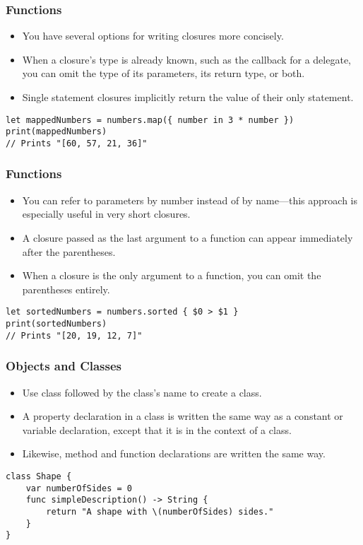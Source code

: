 \begin{frame}[fragile] \frametitle{Functions}
\begin{itemize}
\item You have several options for writing closures more concisely. 
\item When a closure’s type is already known, such as the callback for a delegate, you can omit the type of its parameters, its return type, or both. 
\item Single statement closures implicitly return the value of their only statement.
\end{itemize}

\begin{lstlisting}
let mappedNumbers = numbers.map({ number in 3 * number })
print(mappedNumbers)
// Prints "[60, 57, 21, 36]"
\end{lstlisting}

\end{frame}

\begin{frame}[fragile] \frametitle{Functions}
\begin{itemize}
\item You can refer to parameters by number instead of by name—this approach is especially useful in very short closures. 
\item A closure passed as the last argument to a function can appear immediately after the parentheses. 
\item When a closure is the only argument to a function, you can omit the parentheses entirely.
\end{itemize}

\begin{lstlisting}
let sortedNumbers = numbers.sorted { $0 > $1 }
print(sortedNumbers)
// Prints "[20, 19, 12, 7]"
\end{lstlisting}

\end{frame}

\begin{frame}[fragile] \frametitle{Objects and Classes}
\begin{itemize}
\item Use class followed by the class’s name to create a class. 
\item A property declaration in a class is written the same way as a constant or variable declaration, except that it is in the context of a class. 
\item Likewise, method and function declarations are written the same way.
\end{itemize}

\begin{lstlisting}
class Shape {
    var numberOfSides = 0
    func simpleDescription() -> String {
        return "A shape with \(numberOfSides) sides."
    }
}
\end{lstlisting}

\end{frame}

